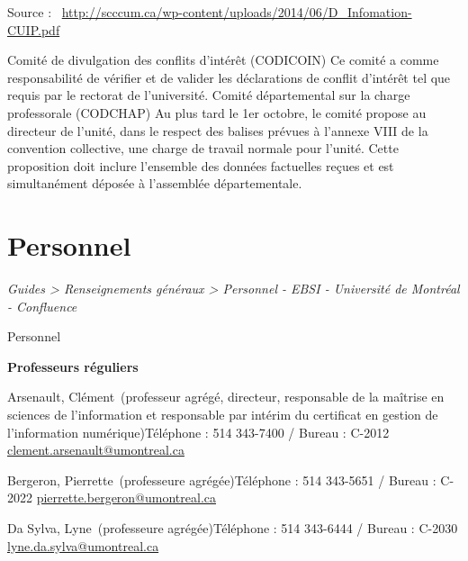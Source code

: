 \documentclass [12 pt]{article}
\begin{document}
            
            Source : 
        \href{
        http://scccum.ca/wp-content/uploads/2014/06/D_Infomation-CUIP.pdf
        } {
        http://scccum.ca/wp-content/uploads/2014/06/D_Infomation-CUIP.pdf
        }
    
            Comité de divulgation des conflits d'intérêt (CODICOIN)
            Ce comité a comme responsabilité de vérifier et de valider les déclarations de
                conflit d'intérêt tel que requis par le rectorat de l'université.
            Comité départemental sur la charge professorale (CODCHAP)
            Au plus tard le 1er octobre, le comité propose au
                directeur de l'unité, dans le respect des balises prévues à l'annexe VIII de la
                convention collective, une charge de travail normale pour l'unité. Cette proposition
                doit inclure l'ensemble des données factuelles reçues et est simultanément déposée à
                l'assemblée départementale.
             
        
    
    
        \newpage
        \section {
        Personnel
        }
        
        
        
        \textit{
        Guides > Renseignements généraux > Personnel - EBSI - Université de Montréal -
            Confluence
        }
    
        Personnel
        
            
        \textbf{
        Professeurs
                réguliers
        }
    
            Arsenault, Clément (professeur agrégé, directeur, responsable
                de la maîtrise en sciences de l'information et responsable par intérim du certificat
                en gestion de l'information numérique)Téléphone : 514 343-7400 / Bureau :
                    C-2012
        \href{
        mailto:clement.arsenault@umontreal.ca
        } {
        clement.arsenault@umontreal.ca
        }
    
            Bergeron, Pierrette (professeure agrégée)Téléphone : 514
                343-5651 / Bureau : C-2022
        \href{
        mailto:pierrette.bergeron@umontreal.ca
        } {
        pierrette.bergeron@umontreal.ca
        }
    
            Da Sylva, Lyne (professeure agrégée)Téléphone : 514
                343-6444 / Bureau : C-2030
        \href{
        mailto:lyne.da.sylva@umontreal.ca
        } {
        lyne.da.sylva@umontreal.ca
        }
    
\end{document}
